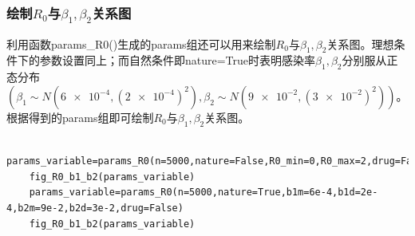 \documentclass{ctexart}
\begin{document}
    \subsubsection{绘制$R_{0}$与$\beta_{1},\beta_{2}$关系图}
    利用函数params\_R0()生成的params组还可以用来绘制$R_{0}$与$\beta_{1},\beta_{2}$关系图。理想条件下的参数设置同上；而自然条件即nature=True时表明感染率$\beta_{1},\beta_{2}$分别服从正态分布$(\beta_{1}\sim N(\num{6e-4},(\num{2e-4})^{2}),\beta_{2}\sim N(\num{9e-2},(\num{3e-2})^{2}))$\cite{7}。根据得到的params组即可绘制$R_{0}$与$\beta_{1},\beta_{2}$关系图。
    \begin{lstlisting}
    params_variable=params_R0(n=5000,nature=False,R0_min=0,R0_max=2,drug=False)
    fig_R0_b1_b2(params_variable)
    params_variable=params_R0(n=5000,nature=True,b1m=6e-4,b1d=2e-4,b2m=9e-2,b2d=3e-2,drug=False)
    fig_R0_b1_b2(params_variable)
\end{lstlisting}
\end{document}

